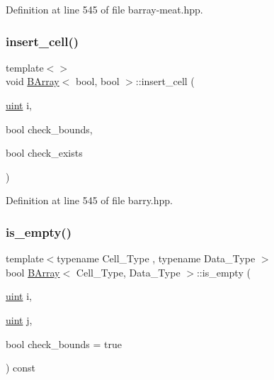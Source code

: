 Definition at line 545 of file barray-\/meat.\+hpp.

\mbox{\label{class_b_array_a9a554db909a326d9110caa1d050f33e4}} 
\subsubsection{\texorpdfstring{insert\+\_\+cell()}{insert\_cell()}\hspace{0.1cm}{\footnotesize\ttfamily [10/10]}}
{\footnotesize\ttfamily template$<$$>$ \\
void \hyperlink{class_b_array}{B\+Array}$<$ bool, bool $>$\+::insert\+\_\+cell (\begin{DoxyParamCaption}\item[{\hyperlink{typedefs_8hpp_a91ad9478d81a7aaf2593e8d9c3d06a14}{uint}}]{i,  }\item[{bool}]{check\+\_\+bounds,  }\item[{bool}]{check\+\_\+exists }\end{DoxyParamCaption})\hspace{0.3cm}{\ttfamily [inline]}}



Definition at line 545 of file barry.\+hpp.

\mbox{\label{class_b_array_a37ed3962c0ee5030b23cb6cde23a5cdf}} 
\subsubsection{\texorpdfstring{is\+\_\+empty()}{is\_empty()}}
{\footnotesize\ttfamily template$<$typename Cell\+\_\+\+Type , typename Data\+\_\+\+Type $>$ \\
bool \hyperlink{class_b_array}{B\+Array}$<$ Cell\+\_\+\+Type, Data\+\_\+\+Type $>$\+::is\+\_\+empty (\begin{DoxyParamCaption}\item[{\hyperlink{typedefs_8hpp_a91ad9478d81a7aaf2593e8d9c3d06a14}{uint}}]{i,  }\item[{\hyperlink{typedefs_8hpp_a91ad9478d81a7aaf2593e8d9c3d06a14}{uint}}]{j,  }\item[{bool}]{check\+\_\+bounds = {\ttfamily true} }\end{DoxyParamCaption}) const\hspace{0.3cm}{\ttfamily [inline]}}



